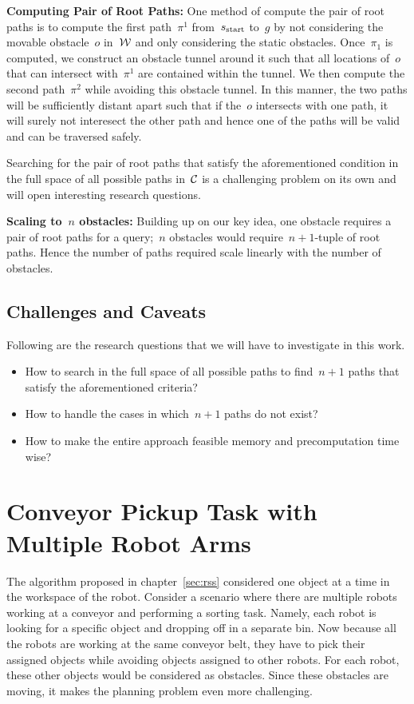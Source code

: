 \documentclass[a4paper]{report}
\begin{document}
\vspace{2mm}
\textbf{Computing Pair of Root Paths:}
One method of compute the pair of root paths is to compute the first path~$\pi^1$ from~$s_{\text{start}}$ to~$g$ by not considering the movable obstacle~$o$ in~$\mathcal{W}$ and only considering the static obstacles. Once~$\pi_1$ is computed, we construct an obstacle tunnel around it such that all locations of~$o$ that can intersect with~$\pi^1$ are contained within the tunnel. We then compute the second path~$\pi^2$ while avoiding this obstacle tunnel. In this manner, the two paths will be sufficiently distant apart such that if the~$o$ intersects with one path, it will surely not interesect the other path and hence one of the paths will be valid and can be traversed safely.

Searching for the pair of root paths that satisfy the aforementioned condition in the full space of all possible paths in~$\mathcal{C}$ is a challenging problem on its own and will open interesting research questions.

\vspace{2mm}
\textbf{Scaling to~$n$ obstacles:}
Building up on our key idea, one obstacle requires a pair of root paths for a query;~$n$ obstacles would require~$n+1$-tuple of root paths. Hence the number of paths required scale linearly with the number of obstacles.

\subsection{Challenges and Caveats}
Following are the research questions that we will have to investigate in this work.
\begin{itemize}
\item How to search in the full space of all possible paths to find~$n+1$ paths that satisfy the aforementioned criteria?
\item How to handle the cases in which~$n+1$ paths do not exist?
\item How to make the entire approach feasible memory and precomputation time wise?
\end{itemize}

\section{Conveyor Pickup Task with Multiple Robot Arms}
The algorithm proposed in chapter~\ref{sec:rss} considered one object at a time in the workspace of the robot. Consider a scenario where there are multiple robots working at a conveyor and performing a sorting task. Namely, each robot is looking for a specific object and dropping off in a separate bin. Now because all the robots are working at the same conveyor belt, they have to pick their assigned objects while avoiding objects assigned to other robots. For each robot, these other objects would be considered as obstacles. Since these obstacles are moving, it makes the planning problem even more challenging.
\end{document}
